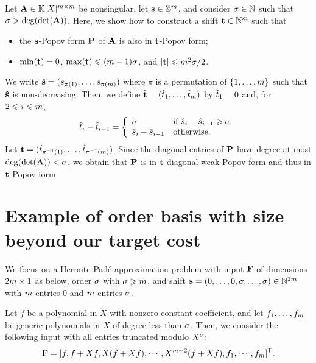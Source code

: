 \documentclass[preprint]{sig-alternate-05-2015}
\begin{document}
Let $\mat{A} \in \polMatSpace[\rdim]$ be nonsingular, let $\shifts \in
\shiftSpace$, and consider $\order \in \NN$ such that $\order >
\deg(\det(\mat{A}))$. Here, we show how to construct a shift $\shifts[t] \in
\NN^\rdim$ such that 
\begin{itemize}
  \item the $\shifts$-Popov form $\mat{P}$ of $\mat{A}$ is also in
    $\shifts[t]$-Popov form;
  \item $\min(\shifts[t]) = 0$, $\max(\shifts[t]) \le (\rdim-1) \order$,
    and $\sshifts[{\shifts[t]}] \le \rdim^2 \order / 2$.
\end{itemize}

We write $\shifts[\hat{s}] = (\shift{\pi(1)},\ldots,\shift{\pi(\rdim)})$ where
$\pi$ is a permutation of $\{1,\ldots,\rdim\}$ such that $\shifts[\hat{s}]$ is
non-decreasing. Then, we define $\shifts[\hat{t}] =
(\shift[\hat{t}]{1},\ldots,\shift[\hat{t}]{\rdim})$ by $\shift[\hat{t}]{1} = 0$
and, for $2 \le i \le \rdim$,
\[ \shift[\hat{t}]{i} - \shift[\hat{t}]{i-1} = \left\{ \begin{array}{ll}
  \order & \text{if } \shift[\hat{s}]{i} - \shift[\hat{s}]{i-1} \ge \order, \\
  \shift[\hat{s}]{i} - \shift[\hat{s}]{i-1} & \text{otherwise}.
  \end{array} \right.
\]
Let $\shifts[t] =
(\shift[\hat{t}]{\pi^{-1}(1)},\ldots,\shift[\hat{t}]{\pi^{-1}(\rdim)})$. Since
the diagonal entries of $\mat{P}$ have degree at most $\deg(\det(\mat{A})) <
\order$, we obtain that $\mat{P}$ is in $\shifts[t]$-diagonal weak Popov form
and thus in $\shifts[t]$-Popov form.

\section{Example of order basis with size beyond our target cost}
\label{app:large_size_mib}

We focus on a Hermite-Pad\'e approximation problem with input $\mat{F}$ of
dimensions $2\rdim \times 1$ as below, order $\order$ with $\order \ge \rdim$,
and shift $\shifts = (0,\ldots,0,\order,\ldots,\order) \in \NN^{2\rdim}$ with
$\rdim$ entries $0$ and $\rdim$ entries $\order$.

Let $f$ be a polynomial in $X$ with nonzero constant coefficient, and let
$f_1,\ldots,f_{\rdim}$ be generic polynomials in $X$ of degree less than
$\order$. Then, we consider the following input with all entries truncated
modulo $X^\order$:
\[\mat{F} =
  \trsp{[ f ,
    f + Xf ,
    X (f + X f) ,
    \cdots ,
    X^{\rdim-2} (f + X f) ,
    f_1 ,
    \cdots ,
  f_\rdim ]}.\]
\end{document}
